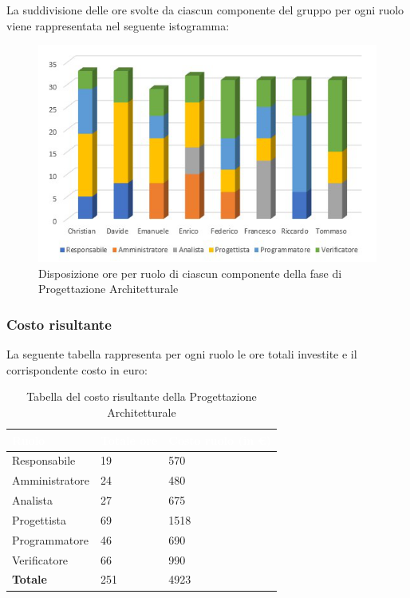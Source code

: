 La suddivisione delle ore svolte da ciascun componente del gruppo per ogni ruolo viene rappresentata nel seguente istogramma:
\begin{figure}[h!]
	\centering
	\includegraphics{Sezioni/Istogrammi/IstogrammaProgettArchitetturale.png}
	\caption{Disposizione ore per ruolo di ciascun componente della fase di Progettazione Architetturale}
\end{figure}

\clearpage

\subsubsection{Costo risultante}
La seguente tabella rappresenta per ogni ruolo le ore totali investite e il corrispondente costo in euro:
{
\renewcommand{\arraystretch}{2}
\begin{longtable}{ C{3cm} C{2cm} C{4cm}}
\caption{Tabella del costo risultante della Progettazione Architetturale}\\

\textcolor{white}{\textbf{Ruolo}} & 
\textcolor{white}{\textbf{Totale ore}} & 
\textcolor{white}{\textbf{Costo ruolo (in \euro{})}}\\	
\endhead
        
Responsabile    &  19 &  570 \\
Amministratore  &  24 &  480 \\
Analista        &  27 &  675 \\
Progettista     &  69 & 1518 \\
Programmatore   &  46 &  690 \\
Verificatore    &  66 &  990 \\
\textbf{Totale} & 251 & 4923 \\	
        	
\end{longtable}
}

